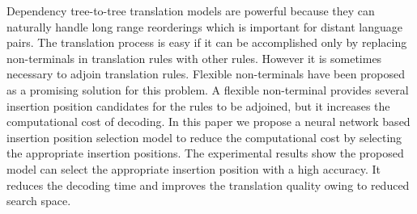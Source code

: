Dependency tree-to-tree translation models are powerful because they can naturally handle long range reorderings which is important for distant language pairs. The translation process is easy if it can be accomplished only by replacing non-terminals in translation rules with other rules. However it is sometimes necessary to adjoin translation rules. Flexible non-terminals have been proposed as a promising solution for this problem. A flexible non-terminal provides several insertion position candidates for the rules to be adjoined, but it increases the computational cost of decoding. In this paper we propose a neural network based insertion position selection model to reduce the computational cost by selecting the appropriate insertion positions. The experimental results show the proposed model can select the appropriate insertion position with a high accuracy. It reduces the decoding time and improves the translation quality owing to reduced search space.
